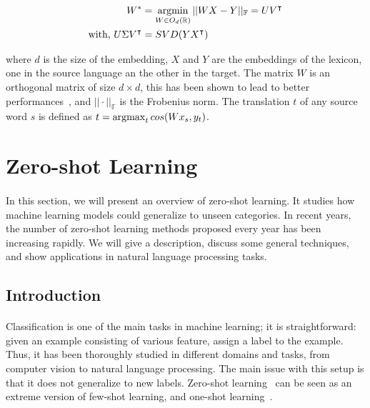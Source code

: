 \begin{equation}
\begin{split}
    W^* & = \operatorname*{argmin}_{W \in O_d(\mathbb{R})} ||WX-Y||_\mathbb{F} = UV^{\intercal} \\
    \text{with, } U\Sigma V^\intercal & = SVD(YX^\intercal) 
\end{split}
    \label{eq:word_alignment}
\end{equation}

where $d$ is the size of the embedding, $X$ and $Y$ are the embeddings of the lexicon, one in the source language an the other in the target. The matrix $W$ is an orthogonal matrix of size $d\times d$, this has been shown to lead to better performances~\citep{xing-etal-2015-normalized}, and $||\cdot||_{\mathbb{F}}$ is the Frobenius norm. The translation $t$ of any source word $s$ is defined as $t = \operatorname*{argmax}_t cos(W x_s, y_t)$.




\section{Zero-shot Learning} 
\label{sec:zero_learning}

\paragraph{}

In this section, we will present an overview of zero-shot learning. It studies how machine learning models could generalize to unseen categories.  In recent years, the number of zero-shot learning methods proposed every year has been increasing rapidly. We will give a description, discuss some general techniques, and show applications in natural language processing tasks. %

\subsection{Introduction}
\paragraph{}
Classification is one of the main tasks in machine learning; it is straightforward: given an example consisting of various feature, assign a label to the example. Thus, it has been thoroughly studied in different domains and tasks, from computer vision to natural language processing.  The main issue with this setup is that it does not generalize to new labels. Zero-shot learning~\citep{larochelle2008zeroshot} can be seen as an extreme version of few-shot learning, and one-shot learning~\citep{miller2002oneshot}.

